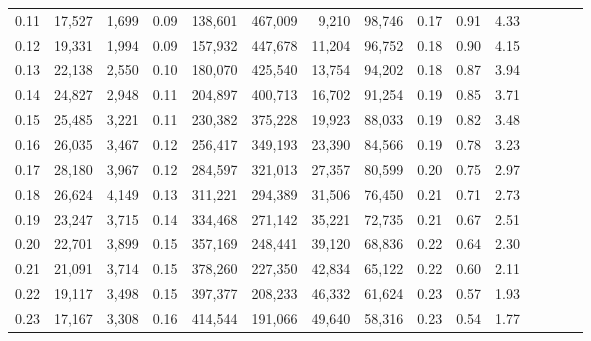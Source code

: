 \begin{tabular}{rrrcrrrrrrrrrrr}
0.11 &  17,527 &  1,699 &                                       0.09 &  138,601 &  467,009 &    9,210 &   98,746 &  0.17 &  0.91 &                         4.33 \\
0.12 &  19,331 &  1,994 &                                       0.09 &  157,932 &  447,678 &   11,204 &   96,752 &  0.18 &  0.90 &                         4.15 \\
0.13 &  22,138 &  2,550 &                                       0.10 &  180,070 &  425,540 &   13,754 &   94,202 &  0.18 &  0.87 &                         3.94 \\
0.14 &  24,827 &  2,948 &                                       0.11 &  204,897 &  400,713 &   16,702 &   91,254 &  0.19 &  0.85 &                         3.71 \\
0.15 &  25,485 &  3,221 &                                       0.11 &  230,382 &  375,228 &   19,923 &   88,033 &  0.19 &  0.82 &                         3.48 \\
0.16 &  26,035 &  3,467 &                                       0.12 &  256,417 &  349,193 &   23,390 &   84,566 &  0.19 &  0.78 &                         3.23 \\
0.17 &  28,180 &  3,967 &                                       0.12 &  284,597 &  321,013 &   27,357 &   80,599 &  0.20 &  0.75 &                         2.97 \\
0.18 &  26,624 &  4,149 &                                       0.13 &  311,221 &  294,389 &   31,506 &   76,450 &  0.21 &  0.71 &                         2.73 \\
0.19 &  23,247 &  3,715 &                                       0.14 &  334,468 &  271,142 &   35,221 &   72,735 &  0.21 &  0.67 &                         2.51 \\
0.20 &  22,701 &  3,899 &                                       0.15 &  357,169 &  248,441 &   39,120 &   68,836 &  0.22 &  0.64 &                         2.30 \\
0.21 &  21,091 &  3,714 &                                       0.15 &  378,260 &  227,350 &   42,834 &   65,122 &  0.22 &  0.60 &                         2.11 \\
0.22 &  19,117 &  3,498 &                                       0.15 &  397,377 &  208,233 &   46,332 &   61,624 &  0.23 &  0.57 &                         1.93 \\
0.23 &  17,167 &  3,308 &                                       0.16 &  414,544 &  191,066 &   49,640 &   58,316 &  0.23 &  0.54 &                         1.77 \\

\end{tabular}
